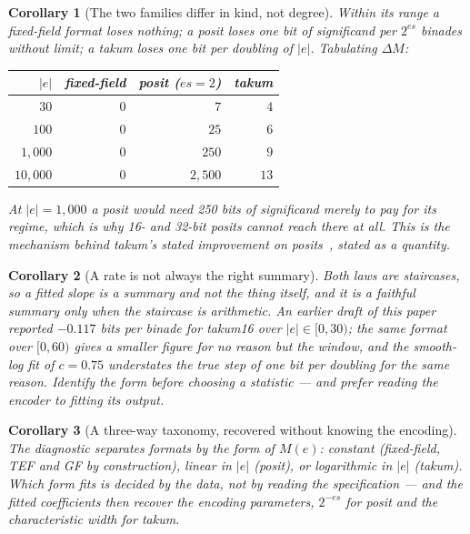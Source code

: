 \documentclass[11pt]{article}
\newtheorem{corollary}{Corollary}
\theoremstyle{definition}
\begin{document}
\begin{corollary}[The two families differ in kind, not degree]
Within its range a fixed-field format loses nothing; a posit loses one bit of
significand per $2^{es}$ binades without limit; a takum loses one bit per
\emph{doubling} of $|e|$. Tabulating $\Delta M$:

\begin{center}
\begin{tabular}{rrrr}
\toprule
$|e|$ & fixed-field & posit ($es{=}2$) & takum \\
\midrule
$30$      & $0$ & $7$    & $4$ \\
$100$     & $0$ & $25$   & $6$ \\
$1{,}000$   & $0$ & $250$  & $9$ \\
$10{,}000$  & $0$ & $2{,}500$ & $13$ \\
\bottomrule
\end{tabular}
\end{center}

At $|e| = 1{,}000$ a posit would need 250 bits of significand merely to pay for
its regime, which is why 16- and 32-bit posits cannot reach there at all. This is
the mechanism behind takum's stated improvement on posits~\cite{takum}, stated as
a quantity.
\end{corollary}

\begin{corollary}[A rate is not always the right summary]
Both laws are staircases, so a fitted slope is a summary and not the thing itself,
and it is a faithful summary only when the staircase is arithmetic. An earlier
draft of this paper reported $-0.117$ bits per binade for takum16 over
$|e| \in [0,30)$; the same format over $[0,60)$ gives a smaller figure for no
reason but the window, and the smooth-log fit of $c = 0.75$ understates the true
step of one bit per doubling for the same reason. Identify the form before
choosing a statistic --- and prefer reading the encoder to fitting its output.
\end{corollary}

\begin{corollary}[A three-way taxonomy, recovered without knowing the encoding]
The diagnostic separates formats by the \emph{form} of $M(e)$: constant
(fixed-field, TEF and GF by construction), linear in $|e|$ (posit), or
logarithmic in $|e|$ (takum). Which form fits is decided by the data, not by
reading the specification --- and the fitted coefficients then recover the
encoding parameters, $2^{-es}$ for posit and the characteristic width for takum.
\end{corollary}
\end{document}
